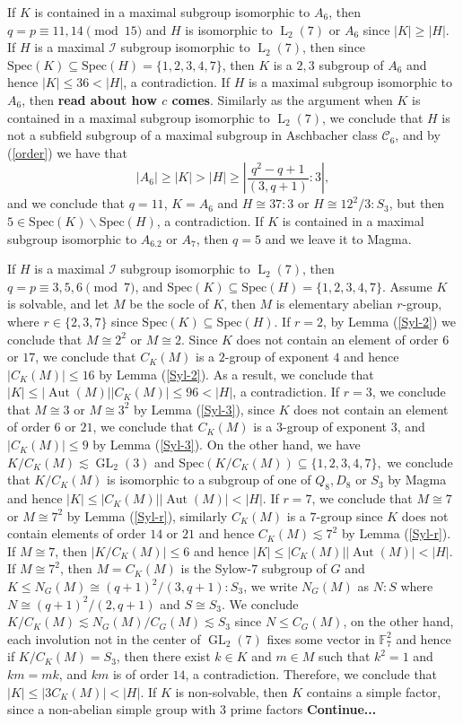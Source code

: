 \documentclass[12pt,reqno]{amsart}
\newcommand{\Aut}{\operatorname{Aut}}
\newcommand{\GL}{\operatorname{GL}}
\newcommand{\LL}{\operatorname{L}}
\newcommand{\FF}{\mathbb{F}}
\theoremstyle{plain}
\theoremstyle{definition}
\begin{document}
   If $K$ is contained in a maximal subgroup isomorphic to $A_6$, then $q=p\equiv 11,14 \pmod {15}$ and $H$ is isomorphic to $\LL_2(7)$ or $A_6$ since $|K|\ge |H|$. If $H$ is a maximal $\mathcal{I}$ subgroup isomorphic to $\LL_2(7)$, then since $\mathrm{Spec}(K)\subseteq \mathrm{Spec}(H)=\{1,2,3,4,7\}$, then $K$ is a $2,3$ subgroup of $A_6$ and hence $|K|\le 36 <|H|$, a contradiction. 
   If $H$ is a maximal subgroup isomorphic to $A_6$, then \textbf{read about how $c$ comes}.
   Similarly as the argument when $K$ is contained in a maximal subgroup isomorphic to $\LL_2(7)$, we conclude that $H$ is not a subfield subgroup of a maximal subgroup in Aschbacher class $\mathcal{C}_6$, and by (\ref{order}) we have that 
   $$|A_6|\ge |K|>|H|\ge |\frac{q^2-q+1}{(3,q+1)}{:}3|,$$
   and we conclude that $q=11$, $K=A_6$ and $H\cong 37{:}3$ or $H\cong 12^2/3{:}S_3$, but then $5\in \mathrm{Spec}(K)\backslash \mathrm{Spec}(H)$, a contradiction.
   If $K$ is contained in a maximal subgroup isomorphic to  $A_6.2$ or $A_7$, then $q=5$ and we leave it to Magma.
   
   If $H$ is a maximal $\mathcal{I}$ subgroup isomorphic to $\LL_2(7)$, then $q=p\equiv 3,5,6\pmod 7$, and $\mathrm{Spec}(K)\subseteq \mathrm{Spec}(H)=\{1,2,3,4,7\}.$
   Assume $K$ is solvable, and let $M$ be the socle of $K$, then $M$ is elementary abelian $r$-group, where $r\in\{2,3,7\}$ since $\mathrm{Spec}(K)\subseteq \mathrm{Spec}(H).$
   If $r=2$, by Lemma (\ref{Syl-2}) we conclude that $M\cong 2^2$ or $M\cong 2$. Since $K$ does not contain an element of order $6$ or $17$, we conclude that $C_{K}(M)$ is a $2$-group of exponent $4$ and hence $|C_{K}(M)|\le 16$ by Lemma (\ref{Syl-2}).
   As a result, we conclude that $|K|\le |\Aut(M)||C_{K}(M)|\le 96< |H|$, a contradiction.
   If $r=3$, we conclude that $M\cong 3$ or $M\cong 3^2$ by Lemma (\ref{Syl-3}), since $K$ does not contain an element of order $6$ or $21$, we conclude that $C_{K}(M)$ is a $3$-group of exponent $3$, and $|C_{K}(M)|\le 9$ by Lemma (\ref{Syl-3}). 
   On the other hand, we have $K/C_{K}(M)\lesssim \GL_2(3)$ and $\mathrm{Spec}(K/C_{K}(M))\subseteq\{1,2,3,4,7\},$   we conclude that $K/C_K(M)$ is isomorphic to a subgroup of one of $Q_8,D_8$ or $S_3$ by Magma and hence $|K|\le |C_{K}(M)||\Aut(M)|<|H|.$
   If $r=7$, we conclude that $M\cong 7$ or $M\cong 7^2$ by Lemma (\ref{Syl-r}), similarly $C_{K}(M)$ is a $7$-group since $K$ does not contain elements of order $14$ or $21$ and hence $C_{K}(M)\lesssim 7^2$ by Lemma (\ref{Syl-r}).
   If $M\cong 7$, then $|K/C_{K}(M)|\le 6$ and hence $|K|\le |C_{K}(M)||\Aut(M)|<|H|$.
   If $M\cong 7^2$, then $M=C_{K}(M)$ is the Sylow-$7$ subgroup of $G$ and $K\le N_G(M)\cong (q+1)^2/(3,q+1){:}S_3$, we write $N_{G}(M)$ as $N{:}S$ where $N\cong (q+1)^2/(2,q+1)$ and $S\cong S_3.$
   We conclude $K/C_{K}(M)\lesssim N_{G}(M)/C_{G}(M)\lesssim S_3$ since $N\le C_{G}(M)$, on the other hand, each involution not in the center of $\GL_2(7)$ fixes some vector in $\FF_{7}^2$ and hence if $K/C_{K}(M)=S_3$, then there exist $k\in K$ and $m\in M$ such that $k^2=1$ and $km=mk$, and $km$ is of order $14$, a contradiction.
   Therefore, we conclude that $|K|\le |3C_{K}(M)|<|H|.$
   If $K$ is non-solvable, then $K$ contains a simple factor, since a non-abelian simple group with $3$ prime factors
   \textbf{Continue...}
   
\end{document}
